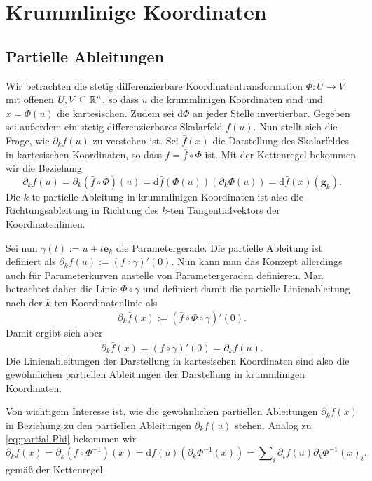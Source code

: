 
\chapter{Krummlinige Koordinaten}

\section{Partielle Ableitungen}

Wir betrachten die stetig differenzierbare Koordinatentransformation
$\Phi\colon U\to V$ mit offenen $U,V\subseteq\mathbb R^n$, so dass
$u$ die krummlinigen Koordinaten sind und $x = \Phi(u)$ die
kartesischen. Zudem sei $\mathrm d\Phi$ an jeder Stelle
invertierbar. Gegeben sei außerdem ein stetig differenzierbares
Skalarfeld $f(u)$. Nun stellt sich die Frage, wie $\partial_k f(u)$ zu
verstehen ist. Sei $\bar f(x)$ die Darstellung des Skalarfeldes in
kartesischen Koordinaten, so dass $f = \bar f\circ\Phi$ ist. Mit der
Kettenregel bekommen wir die Beziehung
\begin{equation}\label{eq:partial-Phi}
\partial_k f(u) = \partial_k (\bar f\circ\Phi)(u)
= \mathrm d\bar f(\Phi(u))(\partial_k\Phi(u))
= \mathrm d\bar f(x)(\mathbf g_k).
\end{equation}
Die $k$-te partielle Ableitung in krummlinigen Koordinaten ist also
die Richtungsableitung in Richtung des $k$-ten Tangentialvektors der
Koordinatenlinien.

Sei nun $\gamma(t):=u+t\mathbf e_k$ die Parametergerade. Die
partielle Ableitung ist definiert als
$\partial_k f(u):=(f\circ\gamma)'(0)$. Nun kann man das Konzept
allerdings auch für Parameterkurven anstelle von Parametergeraden
definieren. Man betrachtet daher die Linie $\Phi\circ\gamma$ und
definiert damit die partielle Linienableitung nach der $k$-ten
Koordinatenlinie als
\begin{equation}
\tilde\partial_k \bar f(x) := (\bar f\circ\Phi\circ\gamma)'(0).
\end{equation}
Damit ergibt sich aber
\begin{equation}
\tilde\partial_k \bar f(x) = (f\circ\gamma)'(0) = \partial_k f(u).
\end{equation}
Die Linienableitungen der Darstellung in kartesischen Koordinaten sind
also die gewöhnlichen partiellen Ableitungen der Darstellung in
krummlinigen Koordinaten.

Von wichtigem Interesse ist, wie die gewöhnlichen partiellen
Ableitungen $\partial_k \bar f(x)$ in Beziehung zu den partiellen
Ableitungen $\partial_k f(u)$ stehen. Analog zu \eqref{eq:partial-Phi}
bekommen wir
\begin{equation}
\partial_k \bar f(x) = \partial_k(f\circ\Phi^{-1})(x)
= \mathrm df(u)(\partial_k\Phi^{-1}(x))
= \sum\nolimits_i\partial_i f(u)\partial_k\Phi^{-1}(x)_i.
\end{equation}
gemäß der Kettenregel.

